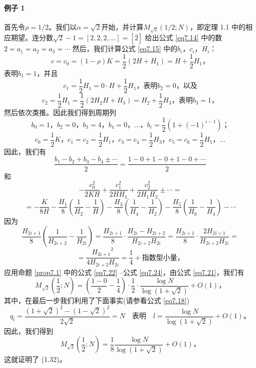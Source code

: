 \documentclass[11pt,a4paper]{article}
\theoremstyle{definition}
\newcommand{\refeq}[1]{公式 \ref{#1}}
\newcommand{\refprop}[1]{命题 \ref{#1}}
\numberwithin{equation}{section}
\newcommand{\comma}{\text{，}}
\newcommand{\juhao}{\text{。}}
\newcommand{\fenhao}{\text{；}}
\newcommand{\erfenzy}{\dfrac{1}{2}}
\newcommand{\myone}[1]{\left(-1\right)^{#1}}
\begin{document}
\paragraph{例子 1}
首先令$ \rho=1/2 $。我们以$ \alpha=\sqrt{2} $开始，并计算$M_{\sqrt{2}}\left(1/2;N\right) $，即定理 1.1 中的相应期望。连分数$ \sqrt{2}-1=\left[2,2,2,\ldots\right]=\left[\overline{2}\right] $ 给出\refeq{eq7.14} 中的数 $ 2=a_{1}=a_{2}=a_{3}=\cdots $ 然后，我们计算\refeq{eq7.15} 中的$ b_{i}\comma c_{i}\comma H_{i} $：
  \[ c=c_{0}=\left(1-\rho\right)K=\dfrac{1}{2}\left(2H+H_{1}\right)=H+\dfrac{1}{2}H_{1}\comma \]
 表明$ b_{1}=1 $，并且 
 \[ c_{1}=\erfenzy H_{1}=0\cdot H+\erfenzy H_{1}\comma\text{表明} b_{2}=0\comma\text{以及} \]
 \[ c_{2}=\erfenzy H_{1}=\erfenzy\left(2H_{2}H+H_{3}\right)=H_{2}+\erfenzy H_{3}\comma\text{表明} b_{3}=1\comma\]
 然后依次类推。因此我们得到周期列
 \[ b_{0}=1\comma b_{2}=0\comma b_{3}=4\comma b_{4}=0\comma\ldots\comma b_{i}=\erfenzy\left(1+\myone{i-1}\right)\fenhao\]
 \[ c_{0}=\erfenzy K\comma c_{1}=c_{2}=\erfenzy H_{1}\comma c_{3}=c_{4}=\erfenzy H_{3}\comma c_{5}=c_{6}=\erfenzy H_{5}\comma\ldots \]
因此，我们有
\begin{equation}\label{eq7.22}
\dfrac{b_{1}-b_{2}+b_{3}-b_{4}\pm\cdots}{2}=\dfrac{1-0+1-0+1-0+\cdots}{2}
\end{equation}
和
\[ -\dfrac{c_{0}^{2}}{2KH}+\dfrac{c_{1}^{2}}{2HH_{1}}+\dfrac{c_{2}^{2}}{2H_{1}H_{2}}\pm\cdots= \]
\begin{equation}\label{eq7.23}
=-\dfrac{K}{8H}-\dfrac{H_{1}}{8}\left(\dfrac{1}{H_{2}}-\dfrac{1}{H}\right)-\dfrac{H_{3}}{8}\left(\dfrac{1}{H_{4}}-\dfrac{1}{H_{2}}\right)-\dfrac{H_{5}}{8}\left(\dfrac{1}{H_{6}}-\dfrac{1}{H_{4}}\right)-\cdots
\end{equation}
因为
\[ \dfrac{H_{2i+1}}{8}\left(\dfrac{1}{H_{2i+2}}-\dfrac{1}{H_{2i}}\right)=\dfrac{H_{2i+1}}{8}\cdot\dfrac{H_{2i}-H_{2i+2}}{H_{2i+2}H_{2i}}=\dfrac{H_{2i+1}}{8}\cdot\dfrac{2H_{2i+1}}{H_{2i+2}H_{2i}}= \]
\begin{equation}\label{eq7.24}
=\dfrac{{H_{2i+1}}^{2}}{4H_{2i+2}H_{2i}}=\dfrac{1}{4}+\text{指数型小量}\comma
\end{equation}
应用\refprop{prop7.1} 中的\refeq{eq7.22} --\refeq{eq7.24}，由\refeq{eq7.21}，我们有
\[ M_{\sqrt{2}}\left(\erfenzy;N\right)=\left(\dfrac{1-0}{2}-\dfrac{1}{4}\right)\cdot\erfenzy\cdot\dfrac{\log N}{\log\left(1+\sqrt{2}\right)}+O(1)\comma \]
其中，在最后一步我们利用了下面事实(请参看\refeq{eq7.18})
\[ q_{l}=\dfrac{(1+\sqrt{2})^{2}-(1-\sqrt{2})^{2}}{2\sqrt{2}}=N\quad \text{表明} \quad l=\dfrac{\log N}{\log\left(1+\sqrt{2}\right)}+O(1)\juhao \]
因此，我们得到
\begin{equation}\label{eq7.25}
M_{\sqrt{2}}\left(\erfenzy;N\right)=\dfrac{1}{8}\dfrac{\log N}{\log\left(1+\sqrt{2}\right)}+O(1)\comma
\end{equation}
这就证明了 (1.32)。
\end{document}
